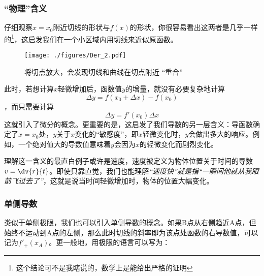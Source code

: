 \subsubsection{“物理”含义}
仔细观察$x=x_0$附近切线的形状与$f(x)$的形状，你很容易看出这两者是几乎一样的\footnote{这个结论可不是我瞎说的，数学上是能给出严格的证明}，这启发我们在一个小区域内用切线来近似原函数。

\begin{figure}[ht]
\centering
\texttt{[image: ./figures/Der\_2.pdf]}
\caption{将切点放大，会发现切线和曲线在切点附近 “重合”}\label{Der_fig1}
\end{figure}

此时，若想计算$x$轻微增加后，函数值$y$的增量，就没有必要复杂地计算
$$\Delta y = f(x_0+\Delta x) - f(x_0)$$
，而只需要计算
\begin{equation}
\Delta y = f'(x_0) \Delta x
\end{equation}
这就引入了微分的概念。更重要的是，这启发了我们导数的另一层含义：导函数确定了$x=x_0$处，$y$关于$x$变化的“敏感度”，即$x$轻微变化时，$y$会做出多大的响应。例如，一个绝对值大的导数值意味着$y$会因为$x$的轻微变化而剧烈变化。

理解这一含义的最直白例子或许是速度，速度被定义为物体位置关于时间的导数$v=\dv{r}{t}$。即使只靠直觉，我们也能理解\textsl{“速度快”就是指“一瞬间他就从我眼前飞过去了”}，这就是说当时间轻微增加时，物体的位置大幅变化。


\subsubsection{单侧导数}
类似于单侧极限，我们也可以引入单侧导数的概念。如果B点从右侧趋近A点，但始终不运动到A点的左侧，那么此时切线的斜率即为该点处函数的右导数值，可以记为$f'_+(x_A)$。更一般地，用极限的语言可以写为：

